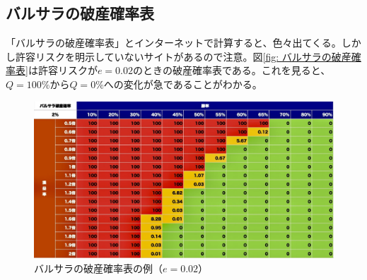 \documentclass[twoside,openright,a4paper,papersize,uplatex,dvipdfmx]{jsarticle}
\begin{document}
  \subsection{バルサラの破産確率表} \label{subsec: バルサラの破産確率表}
  「バルサラの破産確率表」とインターネットで計算すると、色々出てくる。しかし許容リスクを明示していないサイトがあるので注意。図\ref{fig: バルサラの破産確率表}は許容リスクが$e = 0.02$のときの破産確率表である。これを見ると、$Q = 100\%$から$Q = 0\%$への変化が急であることがわかる。

  \begin{figure}[htbp]
    \centering
    \includegraphics[width=120mm]{./fig/16A80743-B572-44E1-ACA1-136F844176C1_1_105_c.jpeg}
    \caption{バルサラの破産確率表の例（$e = 0.02$）}
    \label{fig: バルサラの破産確率表の例}
  \end{figure}

  
\end{document}
